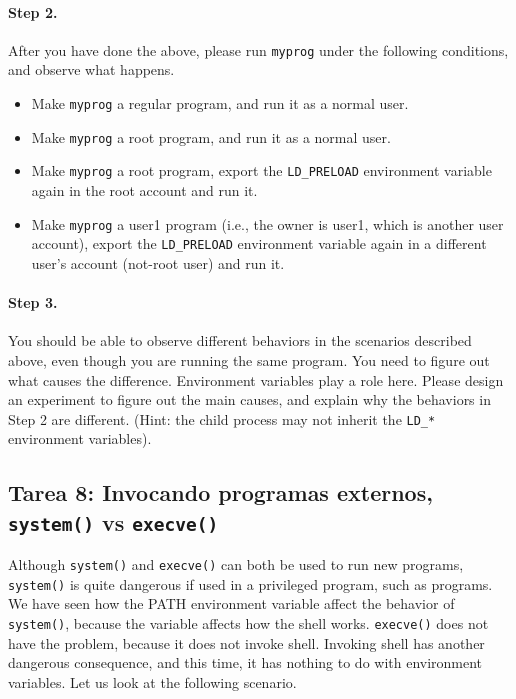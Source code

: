 \paragraph{Step 2.}
After you have done the above, please run {\tt myprog} under the following
conditions, and observe what happens.

  \begin{itemize}
  \item Make {\tt myprog} a regular program, and run it as a normal user.
  \item Make {\tt myprog} a \setuid root program, and run it as a normal user.
  \item Make {\tt myprog} a \setuid root program, export the {\tt LD\_PRELOAD}
  environment variable again in the root account and run it.

  \item Make {\tt myprog} a \setuid user1 program (i.e., the owner is user1, which
        is another user account), export the {\tt LD\_PRELOAD} environment variable
	again in a different user's account (not-root user) and run it.
  \end{itemize}


\paragraph{Step 3.}
You should be able to observe different behaviors in the scenarios
described above, even though you are running the same program.  You need
to figure out what causes the difference. Environment variables
play a role here. Please design an experiment to figure out the
main causes, and explain why the behaviors in Step 2 are
different. (Hint: the child process
may not inherit the {\tt LD\_*} environment variables).



\subsection{Tarea 8: Invocando programas externos, {\tt system()} vs {\tt execve()}}

Although {\tt system()} and {\tt execve()} can both be used to run new
programs, {\tt system()} is quite dangerous if used in a privileged
program, such as \setuid programs. We have seen how the PATH environment
variable affect the behavior of {\tt system()}, because the variable
affects how the shell works. {\tt execve()} does not have the problem,
because it does not invoke shell. Invoking shell has another dangerous
consequence, and this time, it has nothing to do with environment
variables.  Let us look at the following scenario.


